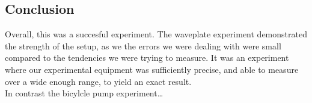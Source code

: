 \documentclass[working, oneside]{inputs/tuftebook}
\begin{document}
\subsection*{Conclusion}
Overall, this was a succesful experiment. The waveplate experiment demonstrated the strength of the setup, as we the errors we were dealing with were small compared to the tendencies we were trying to measure. It was an experiment where our experimental equipment was sufficiently precise, and able to measure over a wide enough range, to yield an exact result. \\
In contrast the bicylcle pump experiment\ldots
\end{document}

